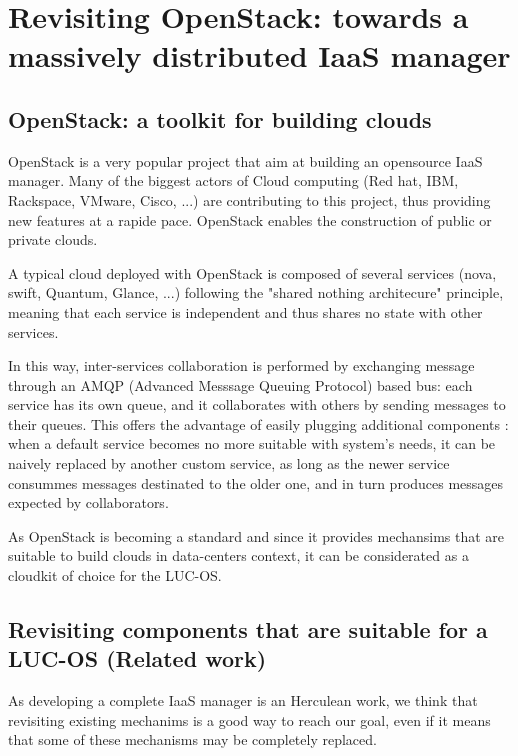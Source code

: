 \section{Revisiting OpenStack: towards a massively distributed IaaS manager}


\subsection{OpenStack: a toolkit for building clouds}

OpenStack is a very popular project that aim at building an opensource IaaS
manager. Many of the biggest actors of Cloud computing (Red hat, IBM, Rackspace,
VMware, Cisco, ...) are contributing to this project, thus providing new 
features at a rapide pace. OpenStack enables the construction of public or 
private clouds.

A typical cloud deployed with OpenStack is composed of several services (nova, 
swift, Quantum, Glance, ...) following the "shared nothing architecure" 
principle, meaning that each service is independent and thus shares no state 
with other services.

In this way, inter-services collaboration is performed by exchanging message 
through an AMQP (Advanced Messsage Queuing Protocol) based bus: each service 
has its own queue, and it collaborates with others by sending messages to their 
queues. This offers the advantage of easily plugging additional components : 
when a default service becomes no more suitable with system's needs, it can be 
naively replaced by another custom service, as long as the newer service 
consummes messages destinated to the older one, and in turn produces messages 
expected by collaborators.

As OpenStack is becoming a standard and since it provides mechansims that are
suitable to build clouds in data-centers context, it can be considerated as a
cloudkit of choice for the LUC-OS. 












\subsection{Revisiting components that are suitable for a LUC-OS (Related work)}
\label{sub:sec:revisiting_openstack}


As developing a complete IaaS manager is an Herculean work, we think that 
revisiting existing mechanims is a good way to reach our goal, even if it means 
that some of these mechanisms may be completely replaced.

